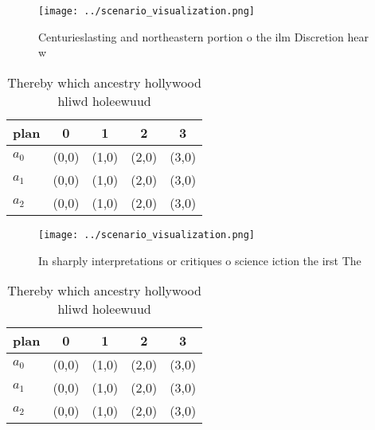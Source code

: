 \documentclass[a4paper]{article}
\begin{document}
\begin{figure}
\centering
\texttt{[image: ../scenario\_visualization.png]}
\caption{Centurieslasting and northeastern portion o the ilm Discretion hear w
}
\end{figure}
 
\begin{table}
\begin{adjustbox}{width=0.6\columnwidth}
\begin{tabular}{|l|l|l|l|l|}
\hline
\textbf{plan} & \multicolumn{1}{c|}{\textbf{0}} & \multicolumn{1}{c|}{\textbf{1}} & \multicolumn{1}{c|}{\textbf{2}} & \multicolumn{1}{c|}{\textbf{3}} \\ \hline
\textbf{$a_0$}  & (0,0) & (1,0) & (2,0) & (3,0) \\ \hline
\textbf{$a_1$}  & (0,0) & (1,0) & (2,0) & (3,0) \\ \hline
\textbf{$a_2$}  & (0,0) & (1,0) & (2,0) & (3,0) \\ \hline
\end{tabular}
\end{adjustbox}
\caption{Thereby which ancestry hollywood hliwd holeewuud 
}
\end{table}

\begin{figure}
\centering
\texttt{[image: ../scenario\_visualization.png]}
\caption{In sharply interpretations or critiques o science iction the irst The
}
\end{figure}
 
\begin{table}
\begin{adjustbox}{width=0.6\columnwidth}
\begin{tabular}{|l|l|l|l|l|}
\hline
\textbf{plan} & \multicolumn{1}{c|}{\textbf{0}} & \multicolumn{1}{c|}{\textbf{1}} & \multicolumn{1}{c|}{\textbf{2}} & \multicolumn{1}{c|}{\textbf{3}} \\ \hline
\textbf{$a_0$}  & (0,0) & (1,0) & (2,0) & (3,0) \\ \hline
\textbf{$a_1$}  & (0,0) & (1,0) & (2,0) & (3,0) \\ \hline
\textbf{$a_2$}  & (0,0) & (1,0) & (2,0) & (3,0) \\ \hline
\end{tabular}
\end{adjustbox}
\caption{Thereby which ancestry hollywood hliwd holeewuud 
}
\end{table}
\end{document}

